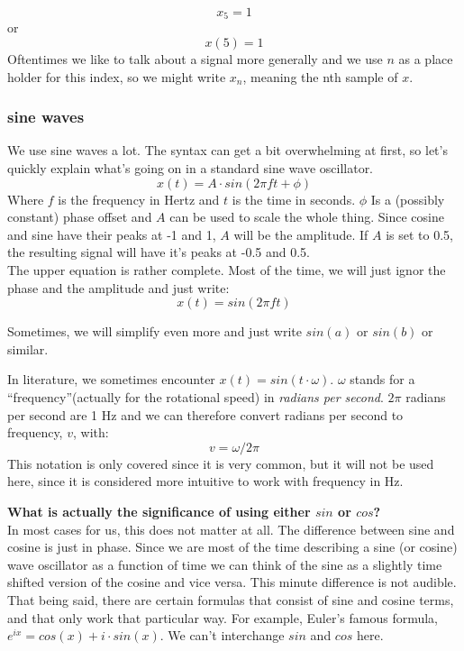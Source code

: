 \begin{equation}
	x_5=1
\end{equation}
or
\begin{equation}
	x(5)=1
\end{equation}
Oftentimes we like to talk about a signal more generally and we use $n$ as a place holder for this index, so we might write $x_n$, meaning the nth sample of $x$.

\subsubsection{sine waves}
We use sine waves a lot. The syntax can get a bit overwhelming at first, so let's quickly explain what's going on in a standard sine wave oscillator.
\begin{equation}
	x(t) = A \cdot sin(2\pi f t + \phi)
\end{equation}
Where $f$ is the frequency in Hertz and $t$ is the time in seconds. $\phi$ Is a (possibly constant) phase offset and $A$ can be used to scale the whole thing. Since cosine and sine have their peaks at -1 and 1, $A$ will be the amplitude. If $A$ is set to 0.5, the resulting signal will have it's peaks at -0.5 and 0.5. \\
The upper equation is rather complete. Most of the time, we will just ignor the phase and the amplitude and just write:
\begin{equation}
	x(t) = sin(2\pi f t )
\end{equation}

Sometimes, we will simplify even more and just write $sin(a)$ or $sin(b)$ or similar.\\
\begin{mdframed}[backgroundcolor=black!10,rightline=false,leftline=false]
In literature, we sometimes encounter $x(t) = sin(t \cdot \omega)$. $\omega$ stands for a ``frequency''(actually for the rotational speed) in \textit{radians per second}. $2\pi$ radians per second are 1 Hz and we can therefore convert radians per second to frequency, $v$, with:
\begin{equation}
  	v = \omega / 2\pi
  \end{equation}
This notation is only covered since it is very common, but it will not be used here, since it is considered more intuitive to work with frequency in Hz.
\vspace{0.5cm}

\textbf{What is actually the significance of using either $sin$ or $cos$?}\\
In most cases for us, this does not matter at all. The difference between sine and cosine is just in phase. Since we are most of the time describing a sine (or cosine) wave oscillator as a function of time we can think of the sine as a slightly time shifted version of the cosine and vice versa. This minute difference is not audible. \\
That being said, there are certain formulas that consist of sine and cosine terms, and that only work that particular way. For example, Euler's famous formula, $e^{ix}=cos(x)+i\cdot sin(x)$. We can't interchange $sin$ and $cos$ here.


\end{mdframed}

